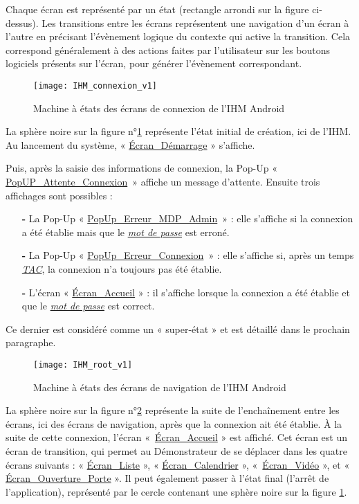 Chaque écran est représenté par un état (rectangle arrondi sur la figure ci-dessus). 
Les transitions entre les écrans représentent une navigation d’un écran à l’autre en précisant l'évènement logique du contexte qui active la transition. 
Cela correspond généralement à des actions faites par l’utilisateur sur les boutons logiciels présents sur l’écran, pour générer l’évènement correspondant.

\begin{figure} [H]
    \centering
    \texttt{[image: IHM\_connexion\_v1]}
    \caption{Machine à états des écrans de connexion de l’IHM Android }
    \label{IHMtest1}
\end{figure}

La sphère noire sur la figure n°\ref{IHMtest1} représente l’état initial de création, ici de l’IHM. 
Au lancement du système, « \hyperlink{EcranDemarrage}{Écran\_Démarrage} » s'affiche. 

Puis, après la saisie des informations de connexion, la Pop-Up « \hyperlink{popUpAttenteConnexion}{PopUP\_Attente\_Connexion}~» affiche un message d’attente. 
Ensuite trois affichages sont possibles : 
\begin{itemize}
    \item[\textbf{-}] La Pop-Up « \hyperlink{popUpErreurMDPAdmin}{PopUp\_Erreur\_MDP\_Admin}~» : elle s'affiche si la connexion a été établie mais que le \hyperlink{mdp}{{\textit{mot de passe}}} est erroné.
    \item[\textbf{-}] La Pop-Up « \hyperlink{popUpErreurConnexion}{PopUp\_Erreur\_Connexion}~» : elle s'affiche si, après un temps \hyperlink{tac}{{\textit{TAC}}}, la connexion n'a toujours pas été établie.
    \item[\textbf{-}] L’écran « \hyperlink{EcranAccueil}{Écran\_Accueil} » : il s'affiche lorsque la connexion a été établie et que le \hyperlink{mdp}{{\textit{mot de passe}}} est correct.
\end{itemize}
Ce dernier est considéré comme un « super-état » et est détaillé dans le prochain paragraphe.

\hypertarget{MaEHome}{}
\begin{figure} [H]
    \centering
    \texttt{[image: IHM\_root\_v1]}
    \caption{Machine à états des écrans de navigation de l’IHM Android}
    \label{IHMtest2}
\end{figure}

La sphère noire sur la figure n°\ref{IHMtest2} représente la suite de l’enchaînement entre les écrans, ici des écrans de navigation, après que la connexion ait été établie. 
À la suite de cette connexion, l’écran «~\hyperlink{EcranAccueil}{Écran\_Accueil} » est affiché.
Cet écran est un écran de transition, qui permet au Démonstrateur de se déplacer dans les quatre écrans suivants : « \hyperlink{EcranListe}{Écran\_Liste} », « \hyperlink{EcranCalendrier}{Écran\_Calendrier} », «~\hyperlink{EcranVideo}{Écran\_Vidéo} », et « \hyperlink{EcranPorte}{Écran\_Ouverture\_Porte} ».
Il peut également passer à l’état final (l’arrêt de l’application), représenté par le cercle contenant une sphère noire sur la figure \ref{IHMtest1}.

